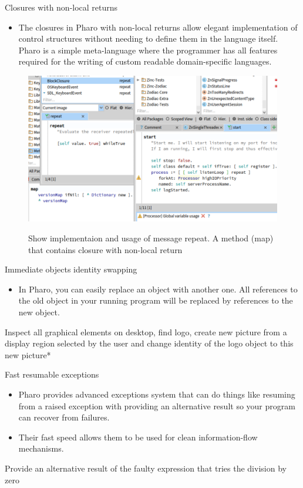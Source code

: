 \documentclass{beamer}
\begin{document}
\begin{frame}{Closures with non-local returns}
\begin{itemize}
    \item The closures in Pharo with non-local returns allow elegant implementation of control structures without needing to define them in the language itself. Pharo is a simple meta-language where the programmer has all features required for the writing of custom readable domain-specific languages.
\end{itemize}
\begin{figure}
    \centering
    \includegraphics[width=0.8\linewidth]{controlStructures.png}
    \label{fig:controlStructures}
    \caption{Show implementaion and usage of message repeat. A method (map) that contains closure with non-local return}
\end{figure}
\end{frame}

\begin{frame}{Immediate objects identity swapping}
\begin{itemize}
    \item In Pharo, you can easily replace an object with another one. All references to the old object in your running program will be replaced by references to the new object.
\end{itemize}
\begin{block}{}
Inspect all graphical elements on desktop, find logo, create new picture from a display region selected by the user and change identity of the logo object to this new picture*
\end{block}
\end{frame}

\begin{frame}{Fast resumable exceptions}
\begin{itemize}
    \item Pharo provides advanced exceptions system that can do things like resuming from a raised exception with providing an alternative result so your program can recover from failures.
    \item Their fast speed allows them to be used for clean information-flow mechanisms.
\end{itemize}
\begin{block}{}
Provide an alternative result of the faulty expression that tries the division by zero
\end{block}
\end{frame}
\end{document}
